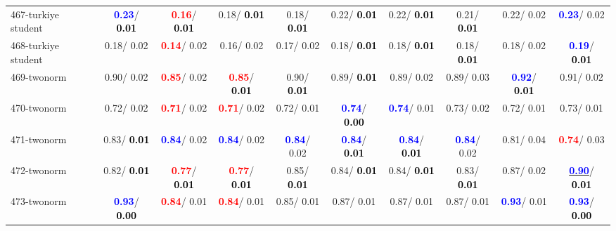 \begin{table}[h]
\begin{center}
{\begin{tabular}{lc|c|c|c|c|c|c|c|c}
467-turkiye student & \textcolor{blue}{\textbf{  0.23}}/\textcolor{black}{\textbf{  0.01}} & \textcolor{red}{\textbf{  0.16}}/\textcolor{black}{\textbf{  0.01}} &   0.18/\textcolor{black}{\textbf{  0.01}} &   0.18/\textcolor{black}{\textbf{  0.01}} &   0.22/\textcolor{black}{\textbf{  0.01}} &   0.22/\textcolor{black}{\textbf{  0.01}} &   0.21/\textcolor{black}{\textbf{  0.01}} &   0.22/  0.02 & \textcolor{blue}{\textbf{  0.23}}/  0.02 \\
468-turkiye student &   0.18/  0.02 & \textcolor{red}{\textbf{  0.14}}/  0.02 &   0.16/  0.02 &   0.17/  0.02 &   0.18/\textcolor{black}{\textbf{  0.01}} &   0.18/\textcolor{black}{\textbf{  0.01}} &   0.18/\textcolor{black}{\textbf{  0.01}} &   0.18/  0.02 & \textcolor{blue}{\textbf{  0.19}}/\textcolor{black}{\textbf{  0.01}} \\
469-twonorm &   0.90/  0.02 & \textcolor{red}{\textbf{  0.85}}/  0.02 & \textcolor{red}{\textbf{  0.85}}/\textcolor{black}{\textbf{  0.01}} &   0.90/\textcolor{black}{\textbf{  0.01}} &   0.89/\textcolor{black}{\textbf{  0.01}} &   0.89/  0.02 &   0.89/  0.03 & \textcolor{blue}{\textbf{  0.92}}/\textcolor{black}{\textbf{  0.01}} &   0.91/  0.02 \\ \hline
470-twonorm &   0.72/  0.02 & \textcolor{red}{\textbf{  0.71}}/  0.02 & \textcolor{red}{\textbf{  0.71}}/  0.02 &   0.72/  0.01 & \textcolor{blue}{\textbf{  0.74}}/\textcolor{black}{\textbf{  0.00}} & \textcolor{blue}{\textbf{  0.74}}/  0.01 &   0.73/  0.02 &   0.72/  0.01 &   0.73/  0.01 \\
471-twonorm &   0.83/\textcolor{black}{\textbf{  0.01}} & \textcolor{blue}{\textbf{  0.84}}/  0.02 & \textcolor{blue}{\textbf{  0.84}}/  0.02 & \textcolor{blue}{\textbf{  0.84}}/  0.02 & \textcolor{blue}{\textbf{  0.84}}/\textcolor{black}{\textbf{  0.01}} & \textcolor{blue}{\textbf{  0.84}}/\textcolor{black}{\textbf{  0.01}} & \textcolor{blue}{\textbf{  0.84}}/  0.02 &   0.81/  0.04 & \textcolor{red}{\textbf{  0.74}}/  0.03 \\
472-twonorm &   0.82/\textcolor{black}{\textbf{  0.01}} & \textcolor{red}{\textbf{  0.77}}/\textcolor{black}{\textbf{  0.01}} & \textcolor{red}{\textbf{  0.77}}/\textcolor{black}{\textbf{  0.01}} &   0.85/\textcolor{black}{\textbf{  0.01}} &   0.84/\textcolor{black}{\textbf{  0.01}} &   0.84/\textcolor{black}{\textbf{  0.01}} &   0.83/\textcolor{black}{\textbf{  0.01}} &   0.87/  0.02 & \underline{\textcolor{blue}{\textbf{  0.90}}}/\textcolor{black}{\textbf{  0.01}} \\
473-twonorm & \textcolor{blue}{\textbf{  0.93}}/\textcolor{black}{\textbf{  0.00}} & \textcolor{red}{\textbf{  0.84}}/  0.01 & \textcolor{red}{\textbf{  0.84}}/  0.01 &   0.85/  0.01 &   0.87/  0.01 &   0.87/  0.01 &   0.87/  0.01 & \textcolor{blue}{\textbf{  0.93}}/  0.01 & \textcolor{blue}{\textbf{  0.93}}/\textcolor{black}{\textbf{  0.00}} \\

\end{tabular}}
\end{center}
\end{table}
